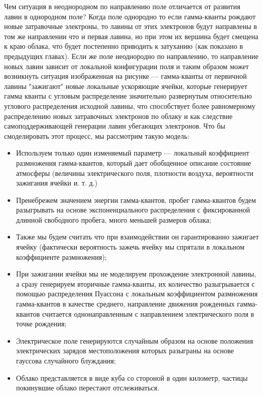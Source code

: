 Чем ситуация в неоднородном по направлению поле отличается от развития лавин в однородном поле? Когда поле однородно то если гамма-кванты рождают новые затравочные электроны, то лавины от этих электронов будут направлены в том же направлении что и  первая лавина, но при этом их вершина будет смещена к  краю облака, что будет постепенно приводить к затуханию (как показано в предыдущих главах). Если же поле неоднородно по направлению, то направление новых лавин зависит от локальной конфигурации поля и таким образом может возникнуть ситуация изображенная на рисунке --- гамма-кванты от первичной лавины "зажигают" новые локальные ускоряющие ячейки, которые генерирует гамма кванты с угловым распределение значительно развернутым относительно углового распределения исходной лавины, что способствует более равномерному распределению новых затравочных электронов по облаку и как следствие  самоподдерживающей генерации лавин убегающих электронов.
Что бы смоделировать этот процесс, мы рассмотрим такую модель:
\begin{itemize}
    \item Используем только один изменяемый параметр --- локальный коэффициент размножения гамма-квантов, который дает обобщенное описание состояние атмосферы (величины электрического поля, плотности воздуха, вероятности зажигания ячейки и. т. д.)
    \item  Пренебрежем значением энергии гамма-квантов, пробег гамма-квантов будем разыгрывать на основе экспоненциального распределения с фиксированной длинной свободного пробега, много меньшей размеров облака;
    \item Также мы будем считать что при взаимодействии он гарантированно зажигает ячейку (фактически вероятность зажечь ячейку мы спрятали в локальном коэффициенте размножения);
    \item При зажигании ячейки мы не моделируем прохождение электронной лавины, а сразу генерируем вторичные гамма-кванты, их количество разыгрывается с помощью распределения Пуассона с локальным коэффициентом размножения гамма-квантов в качестве среднего, направление движения рожденных гамма-квантов считается однонаправленным с направлением электрического поля в точке рождения;
    \item Электрическое поле генерируются случайным образом на основе положения электрических зарядов местоположения которых разыграны на основе гауссова случайного блуждания;
    \item Облако представляется в виде куба со стороной в один километр, частицы покинувшие облако перестают отслеживаться.
\end{itemize}


